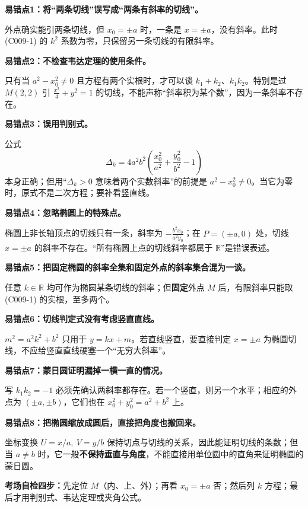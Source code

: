 \begin{trapbox}
\textbf{易错点1：将“两条切线”误写成“两条有斜率的切线”。}

外点确实能引两条切线，但 $x_0=\pm a$ 时，一条是 $x=\pm a$，没有斜率。此时 (C009-1) 的 $k^2$ 系数为零，只保留另一条切线的有限斜率。

\textbf{易错点2：不检查韦达定理的使用条件。}

只有当 $a^2-x_0^2\ne0$ 且方程有两个实根时，才可以谈 $k_1+k_2$、$k_1k_2$。特别是过 $M(2,2)$ 引 $\frac{x^2}{4}+y^2=1$ 的切线，不能声称“斜率积为某个数”，因为一条斜率不存在。

\textbf{易错点3：误用判别式。}

公式
\[
\Delta_k=4a^2b^2\left(\frac{x_0^2}{a^2}+\frac{y_0^2}{b^2}-1\right)
\]
本身正确；但用“$\Delta_k>0$ 意味着两个实数斜率”的前提是 $a^2-x_0^2\ne0$。当它为零时，原式不是二次方程；要补看竖直线。

\textbf{易错点4：忽略椭圆上的特殊点。}

椭圆上非长轴顶点的切线只有一条，斜率为 $-\frac{b^2x_0}{a^2y_0}$；在 $P=(\pm a,0)$ 处，切线 $x=\pm a$ 的斜率不存在。“所有椭圆上点的切线斜率都属于 $\mathbb R$”是错误表述。

\textbf{易错点5：把固定椭圆的斜率全集和固定外点的斜率集合混为一谈。}

任意 $k\in\mathbb R$ 均可作为椭圆某条切线的斜率；但\textbf{固定}外点 $M$ 后，有限斜率只能取 (C009-1) 的实根，至多两个。

\textbf{易错点6：切线判定式没有考虑竖直直线。}

$m^2=a^2k^2+b^2$ 只用于 $y=kx+m$。若直线竖直，要直接判定 $x=\pm a$ 为椭圆切线，不应给竖直直线硬塞一个“无穷大斜率”。

\textbf{易错点7：蒙日圆证明漏掉一横一直的情况。}

写 $k_1k_2=-1$ 必须先确认两斜率都存在。若一个竖直，则另一个水平；相应的外点为 $(\pm a,\pm b)$，它们也在 $x_0^2+y_0^2=a^2+b^2$ 上。

\textbf{易错点8：把椭圆缩放成圆后，直接把角度也搬回来。}

坐标变换 $U=x/a,\ V=y/b$ 保持切点与切线的关系，因此能证明切线的条数；但当 $a\ne b$ 时，它一般\textbf{不保持垂直与角度}，不能直接用单位圆中的直角来证明椭圆的蒙日圆。

\textbf{考场自检四步：}先定位 $M$（内、上、外）；再看 $x_0=\pm a$ 否；然后列 $k$ 方程；最后才用判别式、韦达定理或夹角公式。
\end{trapbox}
